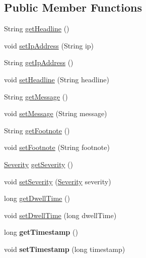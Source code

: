 \subsection*{Public Member Functions}
\begin{DoxyCompactItemize}
\item 
String \hyperlink{classgov_1_1fnal_1_1ppd_1_1dd_1_1xml_1_1EmergencyMessXML_a345b7a93f7061f91319b2b15c6b54d28}{get\-Headline} ()
\item 
void \hyperlink{classgov_1_1fnal_1_1ppd_1_1dd_1_1xml_1_1EmergencyMessXML_a812634cc4c8054f0f5ec1362f4cb753d}{set\-Ip\-Address} (String ip)
\item 
String \hyperlink{classgov_1_1fnal_1_1ppd_1_1dd_1_1xml_1_1EmergencyMessXML_a08a77f7d85f5e8dc4866536b36bc3929}{get\-Ip\-Address} ()
\item 
void \hyperlink{classgov_1_1fnal_1_1ppd_1_1dd_1_1xml_1_1EmergencyMessXML_a8f2fb8bdd96c7d92024e1a22648ad12d}{set\-Headline} (String headline)
\item 
String \hyperlink{classgov_1_1fnal_1_1ppd_1_1dd_1_1xml_1_1EmergencyMessXML_a1b5accf95bbf51b2c7593c5c4059281d}{get\-Message} ()
\item 
void \hyperlink{classgov_1_1fnal_1_1ppd_1_1dd_1_1xml_1_1EmergencyMessXML_a9875a3ef60e1cab734a4e3228577233e}{set\-Message} (String message)
\item 
String \hyperlink{classgov_1_1fnal_1_1ppd_1_1dd_1_1xml_1_1EmergencyMessXML_a8c758c30d72d07f73ae68954d39ed15a}{get\-Footnote} ()
\item 
void \hyperlink{classgov_1_1fnal_1_1ppd_1_1dd_1_1xml_1_1EmergencyMessXML_a580bffe41322beb82d8ed2ceddee38d2}{set\-Footnote} (String footnote)
\item 
\hyperlink{enumgov_1_1fnal_1_1ppd_1_1dd_1_1emergency_1_1Severity}{Severity} \hyperlink{classgov_1_1fnal_1_1ppd_1_1dd_1_1xml_1_1EmergencyMessXML_add95f1e21cc3cebba7fdc75542cc1f35}{get\-Severity} ()
\item 
void \hyperlink{classgov_1_1fnal_1_1ppd_1_1dd_1_1xml_1_1EmergencyMessXML_a17ea3c94965d69d10a6cdcc56fd42292}{set\-Severity} (\hyperlink{enumgov_1_1fnal_1_1ppd_1_1dd_1_1emergency_1_1Severity}{Severity} severity)
\item 
long \hyperlink{classgov_1_1fnal_1_1ppd_1_1dd_1_1xml_1_1EmergencyMessXML_a5df7e406d63e071f34fa3c58962c30ff}{get\-Dwell\-Time} ()
\item 
void \hyperlink{classgov_1_1fnal_1_1ppd_1_1dd_1_1xml_1_1EmergencyMessXML_a44f5f9cca2aa55d48ce653527b33e336}{set\-Dwell\-Time} (long dwell\-Time)
\item 
\hypertarget{classgov_1_1fnal_1_1ppd_1_1dd_1_1xml_1_1EmergencyMessXML_a918f8c4c574ee178147f158a3da97690}{long {\bfseries get\-Timestamp} ()}\label{classgov_1_1fnal_1_1ppd_1_1dd_1_1xml_1_1EmergencyMessXML_a918f8c4c574ee178147f158a3da97690}

\item 
\hypertarget{classgov_1_1fnal_1_1ppd_1_1dd_1_1xml_1_1EmergencyMessXML_ac4c15283b8a81e39be61cc0b074176df}{void {\bfseries set\-Timestamp} (long timestamp)}\label{classgov_1_1fnal_1_1ppd_1_1dd_1_1xml_1_1EmergencyMessXML_ac4c15283b8a81e39be61cc0b074176df}

\end{DoxyCompactItemize}
